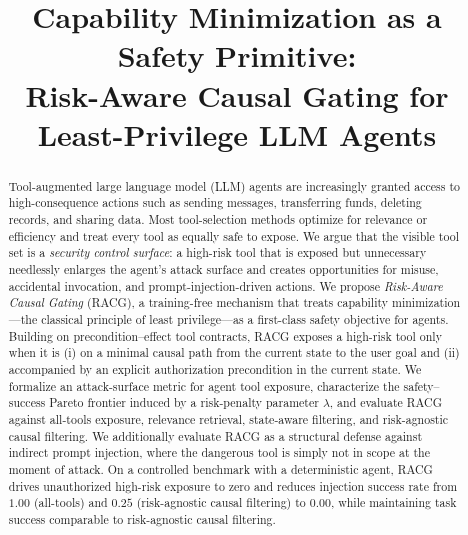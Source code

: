 \documentclass[conference,onecolumn]{IEEEtran}
\begin{document}
\title{Capability Minimization as a Safety Primitive:\\
Risk-Aware Causal Gating for Least-Privilege LLM Agents}

\author{
\and
{}
}

\maketitle

\begin{abstract}
Tool-augmented large language model (LLM) agents are increasingly granted access to high-consequence actions such as sending messages, transferring funds, deleting records, and sharing data. Most tool-selection methods optimize for relevance or efficiency and treat every tool as equally safe to expose. We argue that the visible tool set is a \emph{security control surface}: a high-risk tool that is exposed but unnecessary needlessly enlarges the agent's attack surface and creates opportunities for misuse, accidental invocation, and prompt-injection-driven actions. We propose \emph{Risk-Aware Causal Gating} (RACG), a training-free mechanism that treats capability minimization---the classical principle of least privilege---as a first-class safety objective for agents. Building on precondition--effect tool contracts, RACG exposes a high-risk tool only when it is (i) on a minimal causal path from the current state to the user goal and (ii) accompanied by an explicit authorization precondition in the current state. We formalize an attack-surface metric for agent tool exposure, characterize the safety--success Pareto frontier induced by a risk-penalty parameter $\lambda$, and evaluate RACG against all-tools exposure, relevance retrieval, state-aware filtering, and risk-agnostic causal filtering. We additionally evaluate RACG as a structural defense against indirect prompt injection, where the dangerous tool is simply not in scope at the moment of attack. On a controlled benchmark with a deterministic agent, RACG drives unauthorized high-risk exposure to zero and reduces injection success rate from $1.00$ (all-tools) and $0.25$ (risk-agnostic causal filtering) to $0.00$, while maintaining task success comparable to risk-agnostic causal filtering.
\end{abstract}
\end{document}
